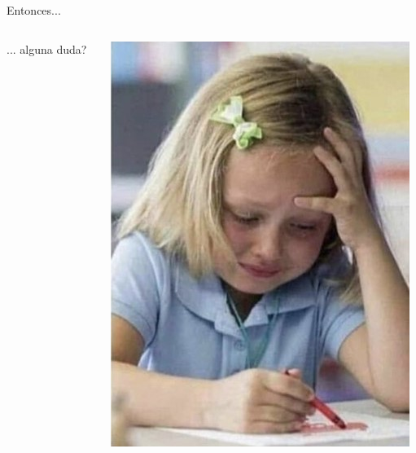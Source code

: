 
\begin{frame}{Entonces...}

    \begin{columns}[T]
        \begin{column}{0.4\linewidth}
            \vspace{3.3cm}

            \Huge ... alguna duda?
        \end{column}
        \begin{column}{0.58\linewidth}
            
            \includegraphics[height=0.8\textheight, width=\linewidth]{img/eval.jpg}
        \end{column}
        
    \end{columns}
    
\end{frame}